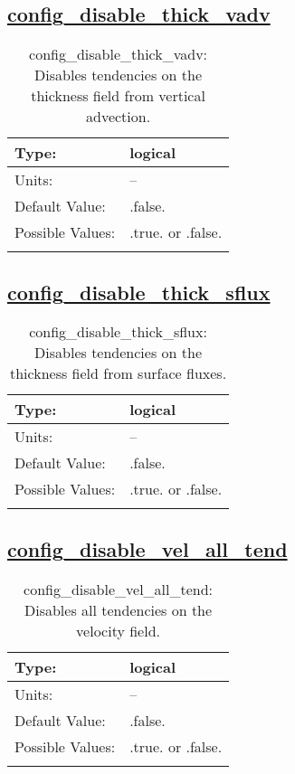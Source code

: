 \subsection[config\_disable\_thick\_vadv]{\hyperref[sec:nm_tab_debug]{config\_disable\_thick\_vadv}}
\label{subsec:nm_sec_config_disable_thick_vadv}
\begin{center}
\begin{longtable}{| p{2.0in} || p{4.0in} |}
    \hline
    Type: & logical \\
    \hline
    Units: & -- \\
    \hline
    Default Value: & .false. \\
    \hline
    Possible Values: & .true. or .false. \\
    \hline
    \caption{config\_disable\_thick\_vadv: Disables tendencies on the thickness field from vertical advection.}
\end{longtable}
\end{center}
\subsection[config\_disable\_thick\_sflux]{\hyperref[sec:nm_tab_debug]{config\_disable\_thick\_sflux}}
\label{subsec:nm_sec_config_disable_thick_sflux}
\begin{center}
\begin{longtable}{| p{2.0in} || p{4.0in} |}
    \hline
    Type: & logical \\
    \hline
    Units: & -- \\
    \hline
    Default Value: & .false. \\
    \hline
    Possible Values: & .true. or .false. \\
    \hline
    \caption{config\_disable\_thick\_sflux: Disables tendencies on the thickness field from surface fluxes.}
\end{longtable}
\end{center}
\subsection[config\_disable\_vel\_all\_tend]{\hyperref[sec:nm_tab_debug]{config\_disable\_vel\_all\_tend}}
\label{subsec:nm_sec_config_disable_vel_all_tend}
\begin{center}
\begin{longtable}{| p{2.0in} || p{4.0in} |}
    \hline
    Type: & logical \\
    \hline
    Units: & -- \\
    \hline
    Default Value: & .false. \\
    \hline
    Possible Values: & .true. or .false. \\
    \hline
    \caption{config\_disable\_vel\_all\_tend: Disables all tendencies on the velocity field.}
\end{longtable}
\end{center}
